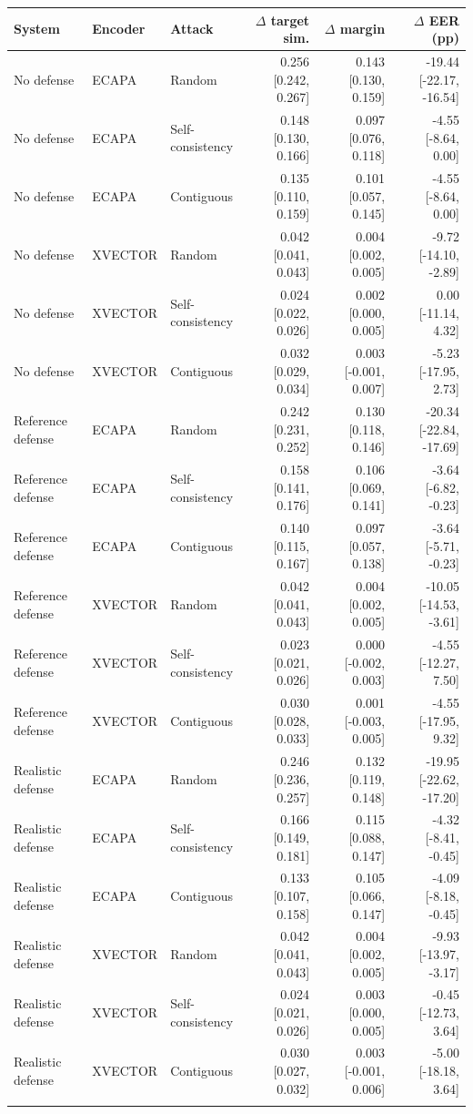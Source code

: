 \begin{tabular}{lllrrr}
\toprule
System & Encoder & Attack & $\Delta$ target sim. & $\Delta$ margin & $\Delta$ EER (pp) \\
\midrule
No defense & ECAPA & Random & 0.256 [0.242, 0.267] & 0.143 [0.130, 0.159] & -19.44 [-22.17, -16.54] \\
No defense & ECAPA & Self-consistency & 0.148 [0.130, 0.166] & 0.097 [0.076, 0.118] & -4.55 [-8.64, 0.00] \\
No defense & ECAPA & Contiguous & 0.135 [0.110, 0.159] & 0.101 [0.057, 0.145] & -4.55 [-8.64, 0.00] \\
No defense & XVECTOR & Random & 0.042 [0.041, 0.043] & 0.004 [0.002, 0.005] & -9.72 [-14.10, -2.89] \\
No defense & XVECTOR & Self-consistency & 0.024 [0.022, 0.026] & 0.002 [0.000, 0.005] & 0.00 [-11.14, 4.32] \\
No defense & XVECTOR & Contiguous & 0.032 [0.029, 0.034] & 0.003 [-0.001, 0.007] & -5.23 [-17.95, 2.73] \\
\addlinespace
Reference defense & ECAPA & Random & 0.242 [0.231, 0.252] & 0.130 [0.118, 0.146] & -20.34 [-22.84, -17.69] \\
Reference defense & ECAPA & Self-consistency & 0.158 [0.141, 0.176] & 0.106 [0.069, 0.141] & -3.64 [-6.82, -0.23] \\
Reference defense & ECAPA & Contiguous & 0.140 [0.115, 0.167] & 0.097 [0.057, 0.138] & -3.64 [-5.71, -0.23] \\
Reference defense & XVECTOR & Random & 0.042 [0.041, 0.043] & 0.004 [0.002, 0.005] & -10.05 [-14.53, -3.61] \\
Reference defense & XVECTOR & Self-consistency & 0.023 [0.021, 0.026] & 0.000 [-0.002, 0.003] & -4.55 [-12.27, 7.50] \\
Reference defense & XVECTOR & Contiguous & 0.030 [0.028, 0.033] & 0.001 [-0.003, 0.005] & -4.55 [-17.95, 9.32] \\
\addlinespace
Realistic defense & ECAPA & Random & 0.246 [0.236, 0.257] & 0.132 [0.119, 0.148] & -19.95 [-22.62, -17.20] \\
Realistic defense & ECAPA & Self-consistency & 0.166 [0.149, 0.181] & 0.115 [0.088, 0.147] & -4.32 [-8.41, -0.45] \\
Realistic defense & ECAPA & Contiguous & 0.133 [0.107, 0.158] & 0.105 [0.066, 0.147] & -4.09 [-8.18, -0.45] \\
Realistic defense & XVECTOR & Random & 0.042 [0.041, 0.043] & 0.004 [0.002, 0.005] & -9.93 [-13.97, -3.17] \\
Realistic defense & XVECTOR & Self-consistency & 0.024 [0.021, 0.026] & 0.003 [0.000, 0.005] & -0.45 [-12.73, 3.64] \\
Realistic defense & XVECTOR & Contiguous & 0.030 [0.027, 0.032] & 0.003 [-0.001, 0.006] & -5.00 [-18.18, 3.64] \\
\addlinespace
\bottomrule
\end{tabular}
